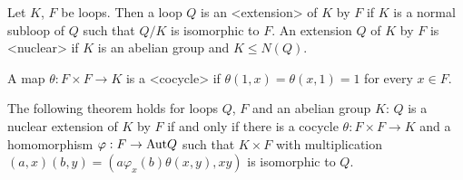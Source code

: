 
Let $K$, $F$ be loops. Then a loop $Q$ is an <extension> of $K$ by $F$ if $K$ is a normal subloop of $Q$ such that $Q/K$ is
isomorphic to $F$. An extension $Q$ of $K$ by $F$ is <nuclear> if $K$ is an abelian group and $K\le N(Q)$.

A map $\theta:F\times F\to K$ is a <cocycle> if $\theta(1,x) =
\theta(x,1) = 1$ for every $x\in F$.

The following theorem holds for loops $Q$, $F$ and an abelian group $K$: $Q$ is
a nuclear extension of $K$ by $F$ if and only if there is a cocycle
$\theta:F\times F\to K$ and a homomorphism $\varphi:F\to{\rm{Aut}}{Q}$ such
that $K\times F$ with multiplication $(a,x)(b,y) =
(a\varphi_x(b)\theta(x,y),xy)$ is isomorphic to $Q$.
